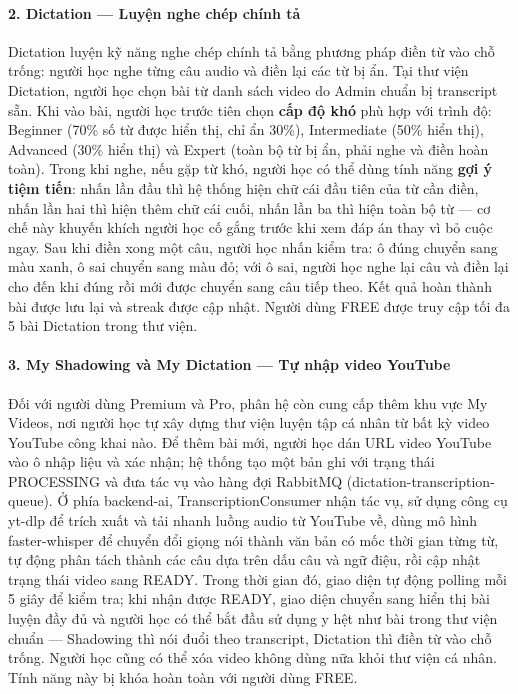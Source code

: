 \paragraph{2. Dictation --- Luyện nghe chép chính tả}

Dictation luyện kỹ năng nghe chép chính tả bằng phương pháp điền từ vào chỗ trống: người học nghe từng câu audio và điền lại các từ bị ẩn. Tại thư viện Dictation, người học chọn bài từ danh sách video do Admin chuẩn bị transcript sẵn. Khi vào bài, người học trước tiên chọn \textbf{cấp độ khó} phù hợp với trình độ: Beginner (70\% số từ được hiển thị, chỉ ẩn 30\%), Intermediate (50\% hiển thị), Advanced (30\% hiển thị) và Expert (toàn bộ từ bị ẩn, phải nghe và điền hoàn toàn). Trong khi nghe, nếu gặp từ khó, người học có thể dùng tính năng \textbf{gợi ý tiệm tiến}: nhấn lần đầu thì hệ thống hiện chữ cái đầu tiên của từ cần điền, nhấn lần hai thì hiện thêm chữ cái cuối, nhấn lần ba thì hiện toàn bộ từ --- cơ chế này khuyến khích người học cố gắng trước khi xem đáp án thay vì bỏ cuộc ngay. Sau khi điền xong một câu, người học nhấn kiểm tra: ô đúng chuyển sang màu xanh, ô sai chuyển sang màu đỏ; với ô sai, người học nghe lại câu và điền lại cho đến khi đúng rồi mới được chuyển sang câu tiếp theo. Kết quả hoàn thành bài được lưu lại và streak được cập nhật. Người dùng FREE được truy cập tối đa 5 bài Dictation trong thư viện.

\paragraph{3. My Shadowing và My Dictation --- Tự nhập video YouTube}

Đối với người dùng Premium và Pro, phân hệ còn cung cấp thêm khu vực My Videos, nơi người học tự xây dựng thư viện luyện tập cá nhân từ bất kỳ video YouTube công khai nào. Để thêm bài mới, người học dán URL video YouTube vào ô nhập liệu và xác nhận; hệ thống tạo một bản ghi với trạng thái PROCESSING và đưa tác vụ vào hàng đợi RabbitMQ (dictation-transcription-queue). Ở phía backend-ai, TranscriptionConsumer nhận tác vụ, sử dụng công cụ yt-dlp để trích xuất và tải nhanh luồng audio từ YouTube về, dùng mô hình faster-whisper để chuyển đổi giọng nói thành văn bản có mốc thời gian từng từ, tự động phân tách thành các câu dựa trên dấu câu và ngữ điệu, rồi cập nhật trạng thái video sang READY. Trong thời gian đó, giao diện tự động polling mỗi 5 giây để kiểm tra; khi nhận được READY, giao diện chuyển sang hiển thị bài luyện đầy đủ và người học có thể bắt đầu sử dụng y hệt như bài trong thư viện chuẩn --- Shadowing thì nói đuổi theo transcript, Dictation thì điền từ vào chỗ trống. Người học cũng có thể xóa video không dùng nữa khỏi thư viện cá nhân. Tính năng này bị khóa hoàn toàn với người dùng FREE.

